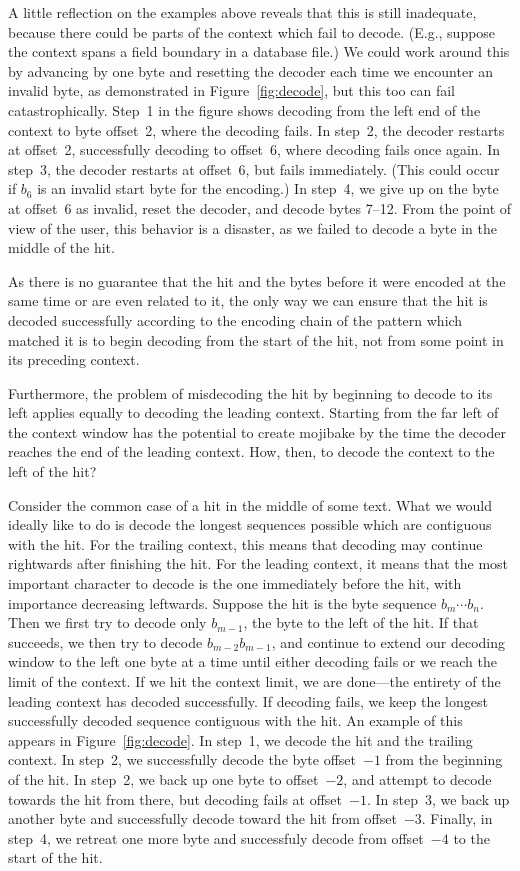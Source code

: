 \documentclass[5p,final,number,sort&compress]{elsarticle}
\begin{document}
A little reflection on the examples above reveals that this is still inadequate, because there could be parts of the context which fail to decode. (E.g., suppose the context spans a field boundary in a database file.) We could work around this by advancing by one byte and resetting the decoder each time we encounter an invalid byte, as demonstrated in Figure~\ref{fig:decode}, but this too can fail catastrophically. Step~1 in the figure shows decoding from the left end of the context to byte offset~2, where the decoding fails. In step~2, the decoder restarts at offset~2, successfully decoding to offset~6, where decoding fails once again. In step~3, the decoder restarts at offset~6, but fails immediately. (This could occur if $b_6$ is an invalid start byte for the encoding.) In step~4, we give up on the byte at offset~6 as invalid, reset the decoder, and decode bytes 7--12. From the point of view of the user, this behavior is a disaster, as we failed to decode a byte in the middle of the hit.

As there is no guarantee that the hit and the bytes before it were encoded at the same time or are even related to it, the only way we can ensure that the hit is decoded successfully according to the encoding chain of the pattern which matched it is to begin decoding from the start of the hit, not from some point in its preceding context.

Furthermore, the problem of misdecoding the hit by beginning to decode to its left applies equally to decoding the leading context. Starting from the far left of the context window has the potential to create mojibake by the time the decoder reaches the end of the leading context. How, then, to decode the context to the left of the hit?

Consider the common case of a hit in the middle of some text. What we would ideally like to do is decode the longest sequences possible which are contiguous with the hit. For the trailing context, this means that decoding may continue rightwards after finishing the hit. For the leading context, it means that the most important character to decode is the one immediately before the hit, with importance decreasing leftwards. Suppose the hit is the byte sequence $b_m\dotsb b_n$. Then we first try to decode only $b_{m-1}$, the byte to the left of the hit. If that succeeds, we then try to decode $b_{m-2}b_{m-1}$, and continue to extend our decoding window to the left one byte at a time until either decoding fails or we reach the limit of the context. If we hit the context limit, we are done---the entirety of the leading context has decoded successfully. If decoding fails, we keep the longest successfully decoded sequence contiguous with the hit. An example of this appears in Figure~\ref{fig:decode}. In step~1, we decode the hit and the trailing context. In step~2, we successfully decode the byte offset~$-1$ from the beginning of the hit. In step~2, we back up one byte to offset~$-2$, and attempt to decode towards the hit from there, but decoding fails at offset~$-1$. In step~3, we back up another byte and successfully decode toward the hit from offset~$-3$. Finally, in step~4, we retreat one more byte and successfuly decode from offset~$-4$ to the start of the hit.
\end{document}
